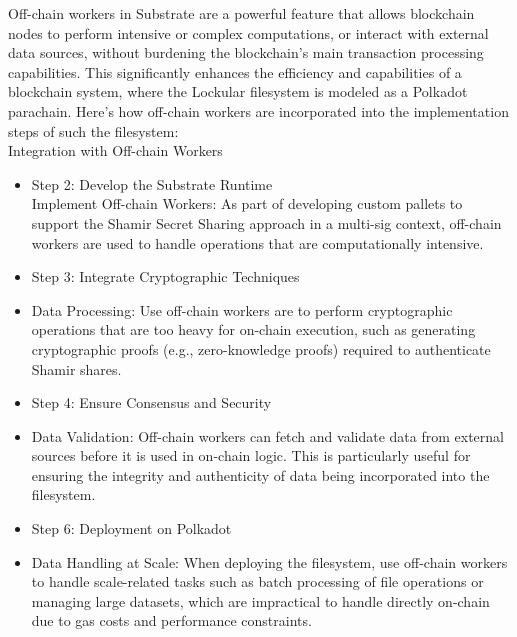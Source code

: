 \documentclass{tufte-handout}
\begin{document}
Off-chain workers in Substrate are a powerful feature that allows blockchain nodes to perform intensive or complex computations, or interact
with external data sources, without burdening the blockchain's main transaction processing capabilities. This significantly enhances the
efficiency and capabilities of a blockchain system, where the Lockular filesystem is modeled as a Polkadot parachain. Here's how off-chain workers are 
incorporated into the implementation steps of such the filesystem:\\
\vspace{5pt}
Integration with Off-chain Workers
\begin{itemize}
\item Step 2: Develop the Substrate Runtime\\
\vspace{5pt}
Implement Off-chain Workers: As part of developing custom pallets to support the Shamir Secret Sharing approach in a multi-sig context, off-chain
workers are used to handle operations that are computationally intensive.
\item Step 3: Integrate Cryptographic Techniques\\
\item \vspace{5pt}
Data Processing: Use off-chain workers are to perform cryptographic operations that are too heavy for on-chain execution, such as generating
cryptographic proofs (e.g., zero-knowledge proofs) required to authenticate Shamir shares.
\item Step 4: Ensure Consensus and Security\\
\item \vspace{5pt}
Data Validation: Off-chain workers can fetch and validate data from external sources before it is used in on-chain logic. This is particularly
useful for ensuring the integrity and authenticity of data being incorporated into the filesystem.
\item Step 6: Deployment on Polkadot\\
\item \vspace{5pt}
Data Handling at Scale: When deploying the filesystem, use off-chain workers to handle scale-related tasks such as batch processing of file
operations or managing large datasets, which are impractical to handle directly on-chain due to gas costs and performance constraints.
\end{itemize}
\end{document}
